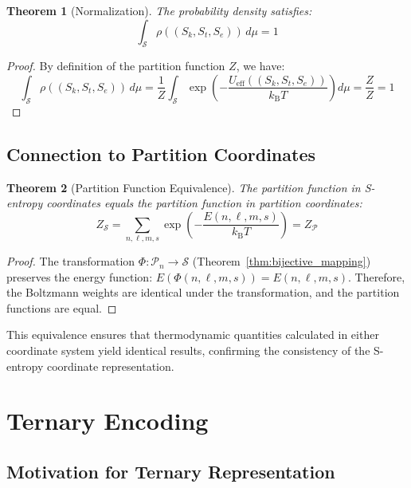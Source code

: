 \documentclass[11pt,twocolumn,a4paper]{article}
\newtheorem{theorem}{Theorem}[section]
\theoremstyle{definition}
\theoremstyle{remark}
\newcommand{\kB}{k_{\mathrm{B}}}
\newcommand{\Sspace}{\mathcal{S}}
\newcommand{\Scoord}{(\Sk,\St,\Se)}
\newcommand{\Sk}{S_k}
\newcommand{\St}{S_t}
\newcommand{\Se}{S_e}
\begin{document}
\begin{theorem}[Normalization]
\label{thm:normalization}
The probability density satisfies:
\begin{equation}
\int_{\Sspace} \rho(\Scoord) \, d\mu = 1
\label{eq:normalization}
\end{equation}
\end{theorem}

\begin{proof}
By definition of the partition function $Z$, we have:
\begin{equation}
\int_{\Sspace} \rho(\Scoord) \, d\mu = \frac{1}{Z} \int_{\Sspace} \exp\left(-\frac{U_{\mathrm{eff}}(\Scoord)}{\kB T}\right) d\mu = \frac{Z}{Z} = 1
\end{equation}
\end{proof}

\subsection{Connection to Partition Coordinates}

\begin{theorem}[Partition Function Equivalence]
\label{thm:partition_equivalence}
The partition function in S-entropy coordinates equals the partition function in partition coordinates:
\begin{equation}
Z_{\Sspace} = \sum_{n,\ell,m,s} \exp\left(-\frac{E(n,\ell,m,s)}{\kB T}\right) = Z_{\mathcal{P}}
\label{eq:partition_equivalence}
\end{equation}
\end{theorem}

\begin{proof}
The transformation $\Phi: \mathcal{P}_n \to \Sspace$ (Theorem~\ref{thm:bijective_mapping}) preserves the energy function: $E(\Phi(n,\ell,m,s)) = E(n,\ell,m,s)$. Therefore, the Boltzmann weights are identical under the transformation, and the partition functions are equal.
\end{proof}

This equivalence ensures that thermodynamic quantities calculated in either coordinate system yield identical results, confirming the consistency of the S-entropy coordinate representation.

\section{Ternary Encoding}
\label{sec:ternary}

\subsection{Motivation for Ternary Representation}
\end{document}
